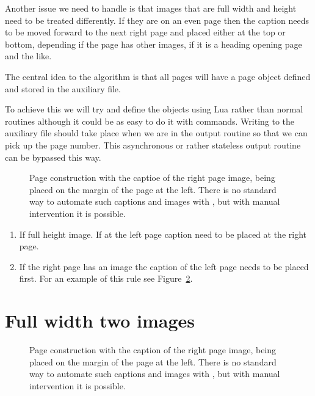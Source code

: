 Another issue we need to handle is that images that are full width and height need to be treated differently. If they are on an even page then the caption needs to be moved forward to the next right page and placed either at the top or bottom, depending if the page has other images, if it is a heading opening page and the like.

The central idea to the algorithm is that all pages will have a page object defined and stored in the auxiliary
file. 

To achieve this we will try and define the objects using Lua rather than normal \tex routines although it could be as easy to do it with \tex commands. Writing to the auxiliary file should take place when we are in the output routine so that we can pick up the page number. This asynchronous or rather stateless output routine can be bypassed this way.

\begin{figure}[tbp]
\centering


\caption{Page construction with the captioe  of the right page image, being placed on the margin of the page at the left. There is no standard way to automate such captions and images with \latexe, but with manual
intervention it is possible.}

\label{elizabeth}
\end{figure}

\begin{enumerate}
\item If full height image. If at the left page caption need to be placed at the right page.
\item If the right page has an image the caption of the left page needs to be placed first.
         For an example of this rule see Figure~\ref{elizabeth}.
\end{enumerate}

\section{Full width two images}

\begin{figure}[tbp]
\caption{Page construction with the caption  of the right page image, being placed on the margin of the page at the left. There is no standard way to automate such captions and images with \latexe, but with manual
intervention it is possible.}
\label{elizabeth}
\end{figure}

